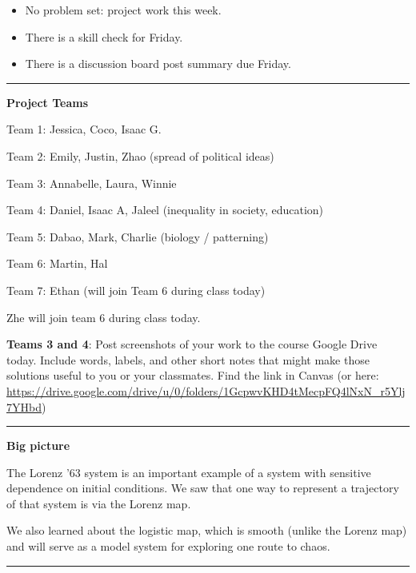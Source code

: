 \documentclass[12pt,letterpaper,noanswers]{exam}
\begin{document}
 \pdfpageheight 11in 
  \pdfpagewidth 8.5in

\noindent 




\begin{itemize}
\item No problem set: project work this week.
\item There is a skill check for Friday.
\item There is a discussion board post summary due Friday.
\end{itemize}

\hrule
\vspace{0.2cm}



\noindent\textbf{Project Teams}

Team 1: Jessica, Coco, Isaac G.

Team 2: Emily, Justin, Zhao (spread of political ideas)

Team 3: Annabelle, Laura, Winnie

Team 4: Daniel, Isaac A, Jaleel (inequality in society, education)

Team 5: Dabao, Mark, Charlie (biology / patterning)

Team 6: Martin, Hal

Team 7: Ethan (will join Team 6 during class today)

Zhe will join team 6 during class today.


\noindent \textbf{Teams 3 and 4}: Post screenshots of your work to the course Google Drive today.  Include words, labels, and other short notes that might make those solutions useful to you or your classmates.  Find the link in Canvas (or here: \url{https://drive.google.com/drive/u/0/folders/1GcpwvKHD4tMecpFQ4lNxN_r5Ylj7YHbd})


\vspace{0.2cm}

\hrule
\vspace{0.2cm}


\noindent\textbf{Big picture}

The Lorenz '63 system is an important example of a system with sensitive dependence on initial conditions.  We saw that one way to represent a trajectory of that system is via the Lorenz map.

We also learned about the logistic map, which is smooth (unlike the Lorenz map) and will serve as a model system for exploring one route to chaos.
\vspace{0.2cm}
\hrule
\vspace{0.2cm}
\end{document}
